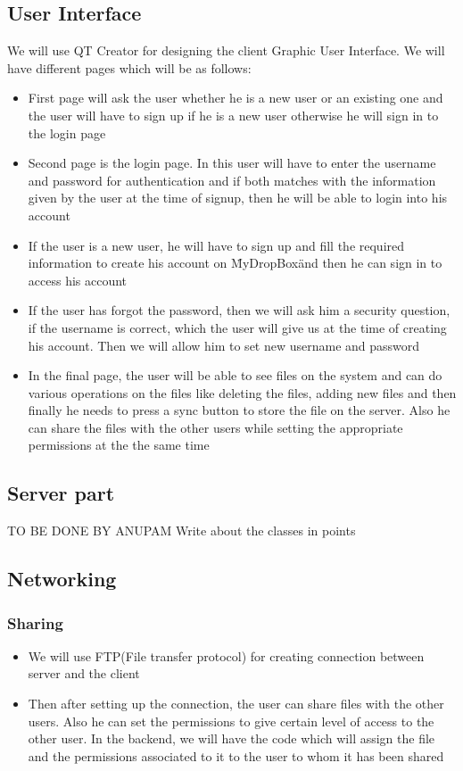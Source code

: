 \documentclass{article}
\begin{document}
\subsection{User Interface}
We will use QT Creator for designing the client Graphic User Interface. We will have different pages which will be as follows:
\begin{itemize}
\item First page will ask the user whether he is a new user or an existing one and the user will have to sign up if he is a new user otherwise he will sign in to the login page
\item Second page is the login page. In this user will have to enter the username and password for authentication and if both matches with the information given by the user at the time of signup, then he will be able to login into his account
\item If the user is a new user, he will have to sign up and fill the required information to create his account on \"MyDropBox\" and then he can sign in to access his account
\item If the user has forgot the password, then we will ask him a security question, if the username is correct, which the user will give us at the time of creating his account. Then we will allow him to set new username and password
\item In the final page, the user will be able to see files on the system and can do various operations on the files like deleting the files, adding new files and then finally he needs to press a sync button to store the file on the server. Also he can share the files with the other users while setting the appropriate permissions at the the same time
\end{itemize}
\subsection{Server part}
TO BE DONE BY ANUPAM
Write about the classes in points
\subsection{Networking}
\subsubsection{Sharing}
\begin{itemize}
\item We will use FTP(File transfer protocol) for creating connection between server and the client
\item Then after setting up the connection, the user can share files with the other users. Also he can set the permissions to give certain level of access to the other user. In the backend, we will have the code which will assign the file and the permissions associated to it to the user to whom it has been shared
\end{itemize}
\end{document}
